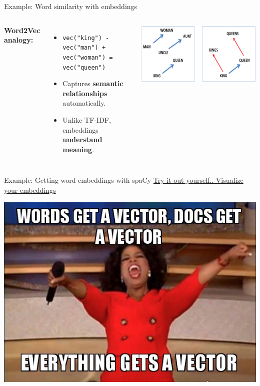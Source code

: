 \documentclass[handout]{beamer}
\begin{document}
\begin{frame}{Example: Word similarity with embeddings}
    \begin{columns}
        \textbf{Word2Vec analogy:}
        \begin{itemize}
            \item \texttt{vec("king") - vec("man") + vec("woman") = vec("queen")}
            \item Captures \textbf{semantic relationships} automatically.
            \item Unlike TF-IDF, embeddings \textbf{understand meaning}.
        \end{itemize}
        \includegraphics[width=\linewidth]{resources/pictures/embeddings.png}  %
    \end{columns}
\end{frame}


\begin{frame}[fragile]{Example: Getting word embeddings with spaCy}
\href{https://github.com/uva-cw-ccs2/2425s2/blob/main/week02/exercise-lecture/visualize-embeddings.ipynb}{Try it out yourself.. Visualize your embeddings}
    \begin{center}
        \includegraphics[width=0.8\linewidth]{resources/pictures/vectors.png}  
    \end{center}
\end{frame}
\end{document}
